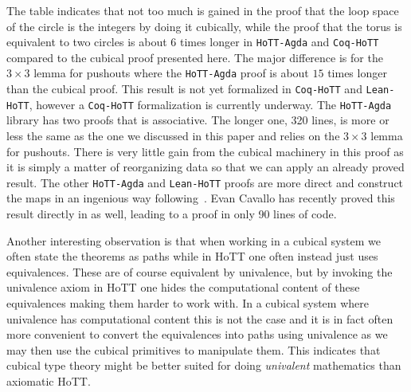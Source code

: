 The table indicates that not too much is gained in the proof that the
loop space of the circle is the integers by doing it cubically, while
the proof that the torus is equivalent to two circles is about $6$
times longer in \texttt{HoTT-Agda} and \texttt{Coq-HoTT} compared to the cubical proof
presented here. The major difference is for the $3 \times 3$ lemma for
pushouts where the \texttt{HoTT-Agda} proof is about $15$ times longer than the
cubical proof. This result is not yet formalized in \texttt{Coq-HoTT} and
\texttt{Lean-HoTT}, however a \texttt{Coq-HoTT} formalization is currently underway. The
\texttt{HoTT-Agda} library has two proofs that  is associative. The
longer one, 320 lines, is more or less the same as the one we
discussed in this paper and relies on the $3 \times 3$ lemma for
pushouts. There is very little gain from the cubical machinery in this
proof as it is simply a matter of reorganizing data so that we can
apply an already proved result. The other \texttt{HoTT-Agda} and \texttt{Lean-HoTT}
proofs are more direct and construct the maps in an ingenious way
following~. Evan Cavallo has recently
proved this result directly in \CubicalAgda as well, leading to a
proof in only 90 lines of code.

Another interesting observation is that when working in a cubical
system we often state the theorems as paths while in HoTT one often
instead just uses equivalences. These are of course equivalent by
univalence, but by invoking the univalence axiom in HoTT one hides the
computational content of these equivalences making them harder to work
with. In a cubical system where univalence has computational content
this is not the case and it is in fact often more convenient to
convert the equivalences into paths using univalence as we may then
use the cubical primitives to manipulate them. This indicates that
cubical type theory might be better suited for doing \emph{univalent}
mathematics than axiomatic HoTT.

